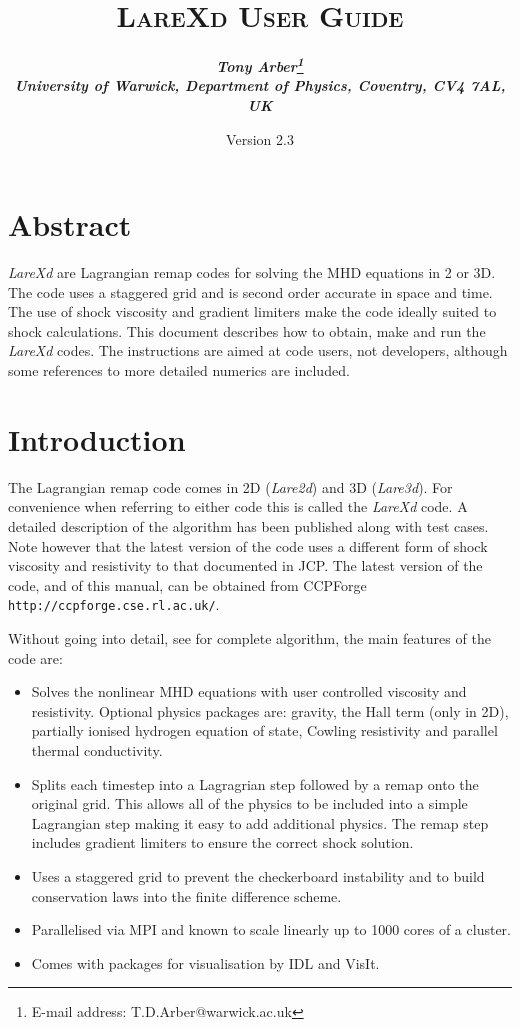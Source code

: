 \documentclass[11pt]{article}
\begin{document}
\title{
\bfseries\scshape LareXd User Guide}
\author{\bfseries\itshape Tony Arber\thanks{E-mail address: T.D.Arber@warwick.ac.uk}\\
University of Warwick, Department of Physics, Coventry, CV4 7AL, UK}
\date{Version 2.3}
\maketitle

\thispagestyle{empty}

\section*{Abstract}
{\it LareXd} are Lagrangian remap codes for solving the MHD equations in 2 or 3D. The code uses a staggered grid and is second order accurate in space and time. The use of shock viscosity and gradient limiters make the code ideally suited to shock calculations. This document describes how to obtain, make and run the {\it LareXd}  codes. The instructions are aimed at code users, not developers, although some references to more detailed numerics are included.


\section{Introduction}
The Lagrangian remap code comes in 2D ({\it Lare2d}) and 3D ({\it Lare3d}). For convenience when referring to either code this is called the {\it LareXd} code. A detailed description of the algorithm has been published \cite{jcp} along with test cases. Note however that the latest version of the code uses a different form of shock viscosity and resistivity to that documented in JCP. The latest version of the code, and of this manual, can be obtained from CCPForge {\tt http://ccpforge.cse.rl.ac.uk/}. 

Without going into detail, see \cite{jcp} for complete algorithm, the main features of the code are:
\begin{itemize}
 \item Solves the nonlinear MHD equations with user controlled viscosity and resistivity. Optional physics packages are: gravity, the Hall term (only in 2D), partially ionised hydrogen equation of state, Cowling resistivity and parallel thermal conductivity.
 \item Splits each timestep into a Lagragrian step followed by a remap onto the original grid. This allows all of the physics to be included into a simple Lagrangian step making it easy to add additional physics. The remap step includes gradient limiters to ensure the correct shock solution.
 \item Uses a staggered grid to prevent the checkerboard instability and to build conservation laws into the finite difference scheme.
 \item Parallelised via MPI and known to scale linearly up to 1000 cores of a cluster.
 \item Comes with packages for visualisation by IDL and VisIt. \cite{visit}
\end{itemize}
\end{document}
